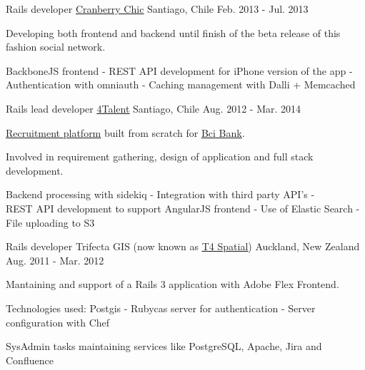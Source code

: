 \begin{cventries}
  \cventry
    {Rails developer} %
    {\href{http://www.cranberrychic.com/}{\underline{Cranberry Chic}}} %
    {Santiago, Chile} %
    {Feb. 2013 - Jul. 2013} %
    {
      \begin{cvitems} %
        \item { Developing both frontend and backend until finish of the beta
                release of this fashion social network.}
        \item { BackboneJS frontend - REST API development for iPhone version of the app -\\
                Authentication with omniauth - Caching management with Dalli + Memcached }
      \end{cvitems}
    }

  \cventry
    {Rails lead developer} %
    {\href{http://4talent.cl/}{\underline{4Talent}}} %
    {Santiago, Chile} %
    {Aug. 2012 - Mar. 2014} %
    {
      \begin{cvitems} %
        \item { \href{http://trabajaenbci.cl/}{\underline{Recruitment platform}}
                built from scratch for \href{https://www.bci.cl/}{\underline{Bci Bank}}.}
        \item { Involved in requirement gathering, design of application and full stack development.}
        \item { Backend processing with sidekiq - Integration with third party API's -\\
                REST API development to support AngularJS frontend -
                Use of Elastic Search - File uploading to S3}
      \end{cvitems}
    }

  \cventry
    {Rails developer} %
    {Trifecta GIS (now known as {\href{http://www.t4spatial.com/}{\underline{T4 Spatial}}})} %
    {Auckland, New Zealand} %
    {Aug. 2011 - Mar. 2012} %
    {
      \begin{cvitems} %
        \item { Mantaining and support of a Rails 3 application with Adobe Flex Frontend.}
        \item { Technologies used: Postgis - Rubycas server for authentication - Server configuration with Chef }
        \item { SysAdmin tasks maintaining services like PostgreSQL, Apache, Jira and Confluence}
      \end{cvitems}
    }


\end{cventries}
